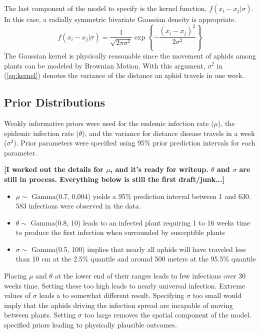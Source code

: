 \documentclass{uwstat572}
\begin{document}
The last component of the model to specify is the kernel function, $f(x_i -x_j | \sigma)$. 
In this case, a radially symmetric bivariate Gaussian density is appropriate. 
\begin{equation} f( x_i-x_j |\sigma) = \frac{1}{\sqrt{2\pi \sigma^2}} \exp \left\{-\frac{(x_i-x_j )^2}{2\sigma^2} \right\} \label{eq:kernel} \end{equation}
The Gaussian kernel is physically reasonable since the movement of aphids among plants can be modeled by Brownian Motion. 
With this argument, $\sigma^2$ in (\ref{eq:kernel}) denotes the variance of the distance an aphid travels in one week. 


\subsection{Prior Distributions}
Weakly informative priors were used for the endemic infection rate ($\mu$), the epidemic infection rate ($\theta$), and the variance for distance disease travels in a week ($\sigma^2$). 
Prior parameters were specified using 95\% prior prediction intervals for each parameter. 

\textbf{[I worked out the details for $\mu$, and it's ready for writeup. $\theta$ and $\sigma$ are still in process. Everything below is still the first draft/junk...]}

\begin{itemize}
\item $\mu \sim$ Gamma(0.7, 0.004) yields a 95\% prediction interval between 1 and 630. 583 infections were observed in the data.
\item $\theta \sim$ Gamma(0.8, 10) leads to an infected plant requiring 1 to 16 weeks time to produce the first infection when surrounded by susceptible plants
\item $\sigma \sim$ Gamma(0.5, 100) implies that nearly all aphids will have traveled less than 10 cm at the 2.5\% quantile and around 500 meters at the 95.5\% quantile
\end{itemize}
Placing $\mu$ and $\theta$ at the lower end of their ranges leads to few infections over 30 weeks time. 
Setting these too high leads to nearly universal infection. 
Extreme values of $\sigma$ leads a to somewhat different result. 
Specifying $\sigma$ too small would imply that the aphids driving the infection spread are incapable of moving between plants. 
Setting $\sigma$ too large removes the spatial component of the model. 
\citet{Brown} specified priors leading to physically plausible outcomes. 
\end{document}
